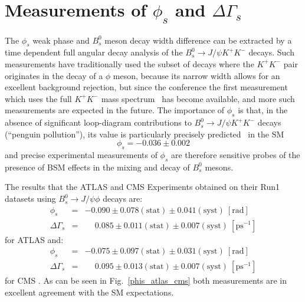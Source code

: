 \section{Measurements of $\phi_s$ and $\Delta\Gamma_s$}
\label{sec:phisdgs}

The $\phi_s$ weak phase and $B^0_s$ meson decay width difference can
be extracted by a time dependent full angular decay analysis of the 
$B^0_s \to J/\psi K^+ K^-$ decays. Such measurements have traditionally
used the subset of decays where the $K^+ K^-$ pair originates in the decay
of a $\phi$ meson, because its narrow width allows for an excellent background
rejection, but since the conference the first measurement which uses
the full $K^+ K^-$ mass spectrum~\cite{LHCbKKHighMass} has become available, and
more such measurements are expected in the future. The importance of
$\phi_s$ is that, in the absence of significant loop-diagram contributions
to $B^0_s \to J/\psi K^+ K^-$ decays (``penguin pollution''),
its value is particularly precisely predicted~\cite{PHISSM} in the SM
\begin{equation}  
\phi_s = -0.036 \pm 0.002
\end{equation}
and precise experimental measurements of $\phi_s$ are therefore 
sensitive probes of the presence of BSM effects in the mixing and decay of $B^0_s$ mesons.

The results that the ATLAS and CMS Experiments obtained on their Run1
datasets using $B^0_s \to J/\psi \phi$ decays are:
\begin{eqnarray}
  \phi_s & = & -0.090 \pm 0.078 (\mbox{stat}) \pm 0.041 (\mbox{syst})\:[\mbox{rad}] \\
  \Delta\Gamma_s & = & \phantom{-}0.085 \pm 0.011 (\mbox{stat}) \pm 0.007 (\mbox{syst})\:[\mbox{ps}^{-1}]
\end{eqnarray}
for ATLAS \cite{atlas_phis_8TeV} and:
\begin{eqnarray}
  \phi_s & = & -0.075 \pm 0.097 (\mbox{stat}) \pm 0.031 (\mbox{syst})\:[\mbox{rad}] \\
  \Delta\Gamma_s & = & \phantom{-}0.095 \pm 0.013 (\mbox{stat}) \pm 0.007 (\mbox{syst})\:[\mbox{ps}^{-1}]
\end{eqnarray}
for CMS \cite{cms_phis}. As can be seen in Fig.~\ref{phis_atlas_cms} both measurements are in
excellent agreement with the SM expectations.

